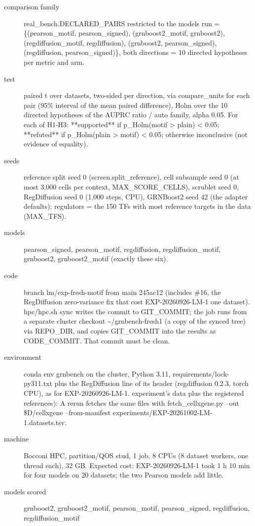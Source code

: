\documentclass{article}
\begin{document}
\begin{description}
\item[comparison family] real\_bench.DECLARED\_PAIRS restricted to the models run = \{(pearson\_motif, pearson\_signed), (grnboost2\_motif, grnboost2), (regdiffusion\_motif, regdiffusion), (grnboost2, pearson\_signed), (regdiffusion, pearson\_signed)\}, both directions = 10 directed hypotheses per metric and arm.
\item[test] paired t over datasets, two-sided per direction, via compare\_units for each pair (95\% interval of the mean paired difference), Holm over the 10 directed hypotheses of the AUPRC ratio / auto family, alpha 0.05. For each of H1-H3: **supported** if p\_Holm(motif > plain) < 0.05; **refuted** if p\_Holm(plain > motif) < 0.05; otherwise inconclusive (not evidence of equality).
\item[seeds] reference split seed 0 (screen.split\_reference), cell subsample seed 0 (at most 3,000 cells per context, MAX\_SCORE\_CELLS), scrublet seed 0, RegDiffusion seed 0 (1,000 steps, CPU), GRNBoost2 seed 42 (the adapter defaults); regulators = the 150 TFs with most reference targets in the data (MAX\_TFS).
\item[models] pearson\_signed, pearson\_motif, regdiffusion, regdiffusion\_motif, grnboost2, grnboost2\_motif (exactly these six).
\item[code] branch lm/exp-fresh-motif from main 245ac12 (includes \#16, the RegDiffusion zero-variance fix that cost EXP-20260926-LM-1 one dataset). hpc/hpc.sh sync writes the commit to GIT\_COMMIT; the job runs from a separate cluster checkout \textasciitilde{}/grnbench-fresh1 (a copy of the synced tree) via REPO\_DIR, and copies GIT\_COMMIT into the results as CODE\_COMMIT. That commit must be clean.
\item[environment] conda env grnbench on the cluster, Python 3.11, requirements/lock-py311.txt plus the RegDiffusion line of its header (regdiffusion 0.2.3, torch CPU), as for EXP-20260926-LM-1. experiment's data plus the registered references): A rerun fetches the same files with fetch\_cellxgene.py --out \$D/cellxgene --from-manifest experiments/EXP-20261002-LM-1.datasets.tsv.
\item[machine] Bocconi HPC, partition/QOS stud, 1 job, 8 CPUs (8 dataset workers, one thread each), 32 GB. Expected cost: EXP-20260926-LM-1 took 1 h 10 min for four models on 20 datasets; the two Pearson models add little.
\item[models scored] grnboost2, grnboost2\_motif, pearson\_motif, pearson\_signed, regdiffusion, regdiffusion\_motif
\end{description}
\end{document}
